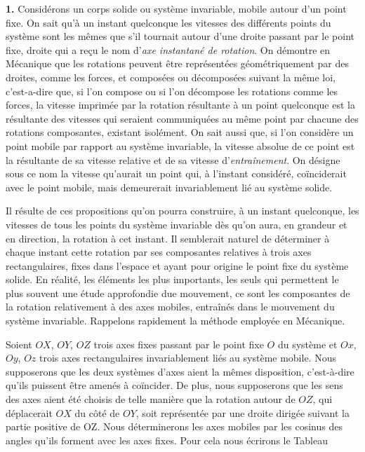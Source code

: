 
\label{chp1}

\textbf{1.} Considérons un corps solide ou système invariable, mobile autour d'un point fixe. On sait qu'à un instant 
quelconque les vitesses des différents points du système sont les mêmes que s'il tournait autour d'une droite passant 
par le point fixe, droite qui a reçu le nom d'\textit{axe instantané de rotation}. On démontre en Mécanique que les 
rotations peuvent être représentées géométriquement par des droites, comme les forces, et composées ou décomposées 
suivant la même loi, c'est-a-dire que, si l'on compose ou si l'on décompose les rotations comme les forces, la vitesse 
imprimée par la rotation résultante à un point quelconque est la résultante des vitesses qui seraient communiquées au 
même point par chacune des rotations composantes, existant isolément. On sait aussi que, si l'on considère un point 
mobile par rapport au système invariable, la vitesse absolue de ce point est la résultante de sa vitesse relative et 
de sa vitesse d'\textit{entraînement}. On désigne sous ce nom la vitesse qu'aurait un point qui, à l'instant considéré, 
coïnciderait avec le point mobile, mais demeurerait invariablement lié au système solide.

Il résulte de ces propositions qu'on pourra construire, à un instant quelconque, les vitesses de tous les points du 
système invariable dès qu'on aura, en grandeur et en direction, la rotation à cet instant. Il semblerait naturel de 
déterminer à chaque instant cette rotation par ses composantes relatives à trois axes rectangulaires, fixes dans 
l'espace et ayant pour origine le point fixe du système solide. En réalité, les éléments les plus importants, les seuls 
qui permettent le plus souvent une étude approfondie due mouvement, ce sont les composantes de la rotation relativement 
à des axes mobiles, entraînés dans le mouvement du système invariable. Rappelons rapidement la méthode employée en 
Mécanique.

Soient $OX$, $OY$, $OZ$ trois axes fixes passant par le point fixe $O$ du système et $Ox$, $Oy$, $Oz$ trois axes 
rectangulaires invariablement liés au système mobile. Nous supposerons que les deux systèmes d'axes aient la mêmes 
disposition, c'est-à-dire qu'ils puissent être amenés à coïncider. De plus, nous supposerons que les sens des axes 
aient été choisis de telle manière que la rotation autour de $OZ$, qui déplacerait $OX$ du côté de $OY$, soit 
représentée par une droite dirigée suivant la partie positive de OZ. Nous déterminerons les axes mobiles par les 
cosinus des angles qu'ils forment avec les axes fixes. Pour cela nous écrirons le Tableau 

